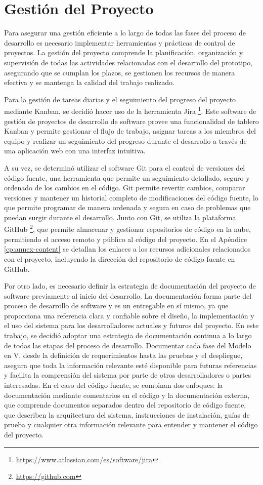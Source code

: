 \section{Gestión del Proyecto}

Para asegurar una gestión eficiente a lo largo de todas las fases del proceso de desarrollo es necesario implementar herramientas y prácticas de control de proyectos. La gestión del proyecto comprende la planificación, organización y supervisión de todas las actividades relacionadas con el desarrollo del prototipo, asegurando que se cumplan los plazos, se gestionen los recursos de manera efectiva y se mantenga la calidad del trabajo realizado.

Para la gestión de tareas diarias y el seguimiento del progreso del proyecto mediante Kanban, se decidió hacer uso de la herramienta Jira \footnote{\url{https://www.atlassian.com/es/software/jira}}. Este \gls{software} de gestión de proyectos de desarrollo de software provee una funcionalidad de tablero Kanban y permite gestionar el flujo de trabajo, asignar tareas a los miembros del equipo y realizar un seguimiento del progreso durante el desarrollo a través de una aplicación web con una interfaz intuitiva. 

A su vez, se determinó utilizar el software Git para el control de versiones del código fuente, una herramienta que permite un seguimiento detallado, seguro y ordenado de los cambios en el código. Git permite revertir cambios, comparar versiones y mantener un historial completo de modificaciones del código fuente, lo que permite programar de manera ordenada y segura en caso de problemas que puedan surgir durante el desarrollo. Junto con Git, se utiliza la plataforma GitHub \footnote{\url{https://github.com}}, que permite almacenar y gestionar repositorios de código en la nube, permitiendo el acceso remoto y público al código del proyecto. En el Apéndice \ref{cp:annex-content} se detallan los enlaces a los recursos adicionales relacionados con el proyecto, incluyendo la dirección del repositorio de código fuente en GitHub.

Por otro lado, es necesario definir la estrategia de documentación del proyecto de software previamente al inicio del desarrollo. La documentación forma parte del proceso de desarrollo de software y es un entregable en sí mismo, ya que proporciona una referencia clara y confiable sobre el diseño, la implementación y el uso del sistema para los desarrolladores actuales y futuros del proyecto. En este trabajo, se decidió adoptar una estrategia de documentación continua a lo largo de todas las etapas del proceso de desarrollo. Documentar cada fase del Modelo en V, desde la definición de requerimientos hasta las pruebas y el despliegue, asegura que toda la información relevante esté disponible para futuras referencias y facilita la comprensión del sistema por parte de otros desarrolladores o partes interesadas. En el caso del código fuente, se combinan dos enfoques: la documentación mediante comentarios en el código y la documentación externa, que comprende documentos separados dentro del repositorio de código fuente, que describen la arquitectura del sistema, instrucciones de instalación, guías de prueba y cualquier otra información relevante para entender y mantener el código del proyecto.

